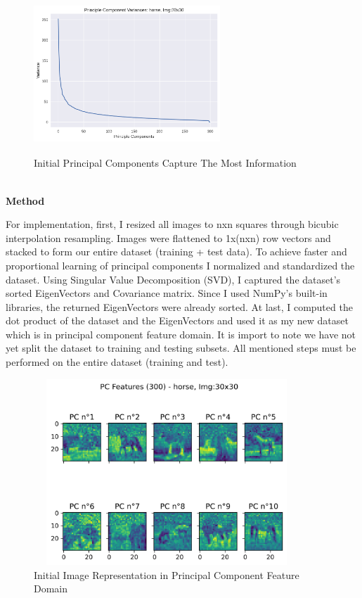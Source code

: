 \documentclass{proposalnsf}
\begin{document}
\begin{figure}[h]
  \caption{Initial Principal Components Capture The Most Information}
  \centering
  \includegraphics[width=7cm, height=6cm]{fig01}
\end{figure}


\ \\

\noindent
{\bf Method}

For implementation, first, I resized all images to nxn squares through bicubic
interpolation resampling. Images were flattened to 1x(nxn) row vectors and stacked to form our entire dataset (training + test data). To achieve faster
and proportional learning of principal components I normalized and standardized
the dataset. Using Singular Value Decomposition (SVD), I captured the dataset's
sorted EigenVectors and Covariance matrix. Since I used NumPy's built-in libraries, the returned EigenVectors were already sorted. At last, I computed
the dot product of the dataset and the EigenVectors and used it as my new dataset which is in principal component feature domain. It is import to note
we have not yet split the dataset to training and testing subsets. All mentioned steps must be performed on the entire dataset (training and test).


\begin{figure}[h]
  \caption{Initial Image Representation in Principal Component Feature Domain}
  \centering
  \includegraphics[width=10cm, height=7cm]{fig02}
\end{figure}
\end{document}
